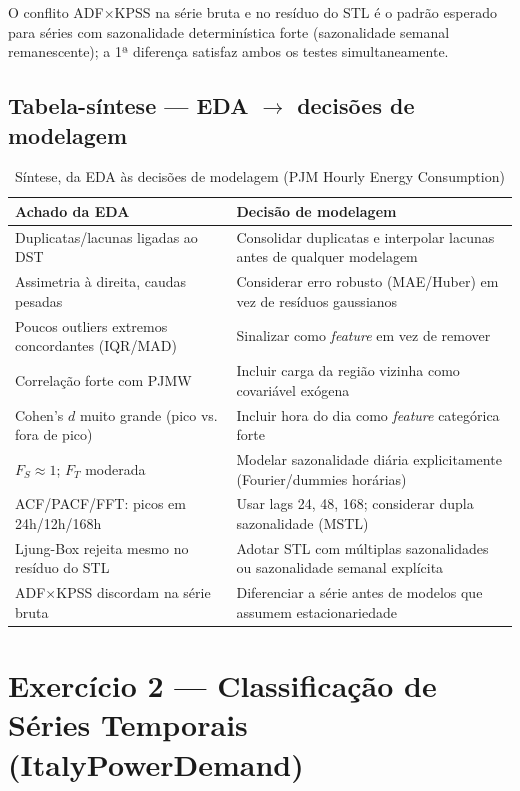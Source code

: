 \documentclass[12pt,a4paper]{article}
\begin{document}
\noindent O conflito ADF$\times$KPSS na série bruta e no resíduo do STL é o padrão esperado para séries com sazonalidade determinística forte (sazonalidade semanal remanescente); a 1ª diferença satisfaz ambos os testes simultaneamente.

\subsection{Tabela-síntese --- EDA $\rightarrow$ decisões de modelagem}

\begin{table}[H]
\centering
\small
\begin{tabular}{p{6.5cm}p{7.5cm}}
\toprule
\textbf{Achado da EDA} & \textbf{Decisão de modelagem} \\
\midrule
Duplicatas/lacunas ligadas ao DST & Consolidar duplicatas e interpolar lacunas antes de qualquer modelagem \\
Assimetria à direita, caudas pesadas & Considerar erro robusto (MAE/Huber) em vez de resíduos gaussianos \\
Poucos outliers extremos concordantes (IQR/MAD) & Sinalizar como \emph{feature} em vez de remover \\
Correlação forte com PJMW & Incluir carga da região vizinha como covariável exógena \\
Cohen's $d$ muito grande (pico vs. fora de pico) & Incluir hora do dia como \emph{feature} categórica forte \\
$F_S\approx 1$; $F_T$ moderada & Modelar sazonalidade diária explicitamente (Fourier/dummies horárias) \\
ACF/PACF/FFT: picos em 24h/12h/168h & Usar lags 24, 48, 168; considerar dupla sazonalidade (MSTL) \\
Ljung-Box rejeita mesmo no resíduo do STL & Adotar STL com múltiplas sazonalidades ou sazonalidade semanal explícita \\
ADF$\times$KPSS discordam na série bruta & Diferenciar a série antes de modelos que assumem estacionariedade \\
\bottomrule
\end{tabular}
\caption{Síntese, da EDA às decisões de modelagem (PJM Hourly Energy Consumption)}
\end{table}

\newpage
\section{Exercício 2 --- Classificação de Séries Temporais (ItalyPowerDemand)}
\end{document}
